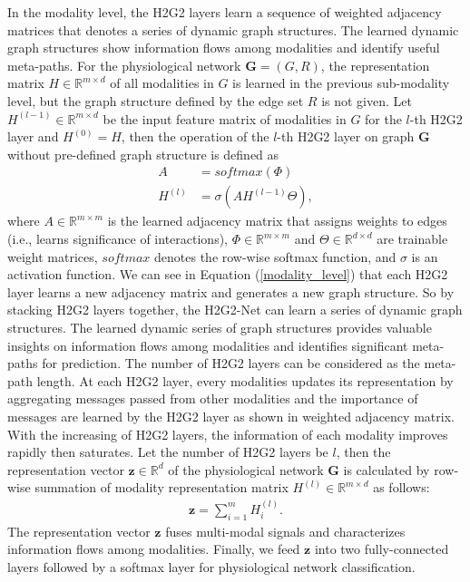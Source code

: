 \documentclass[letterpaper]{article} %
\begin{document}
In the modality level, the H2G2 layers learn a sequence of weighted adjacency matrices that denotes a series of dynamic graph structures. The learned dynamic graph structures show information flows among modalities and identify useful meta-paths. For the physiological network $\mathbf{G}=(G, R)$, the representation matrix $H\in\mathbb{R}^{m\times d}$ of all modalities in $G$ is learned in the previous sub-modality level, but the graph structure defined by the edge set $R$ is not given. Let $H^{(l-1)}\in\mathbb{R}^{m\times d}$ be the input feature matrix of modalities in $G$ for the $l$-th H2G2 layer and $H^{(0)}=H$, then the operation of the $l$-th H2G2 layer on graph $\mathbf{G}$ without pre-defined graph structure is defined as
\begin{align}
    \label{modality_level}
    A &= softmax(\Phi) \\
    H^{(l)} &= \sigma \left( A H^{(l-1)} \Theta \right),
\end{align}
where $A\in\mathbb{R}^{m\times m}$ is the learned adjacency matrix that assigns weights to edges (i.e., learns significance of interactions), $\Phi\in\mathbb{R}^{m\times m}$ and $\Theta\in\mathbb{R}^{d\times d}$ are trainable weight matrices, $softmax$ denotes the row-wise softmax function, and $\sigma$ is an activation function. We can see in Equation (\ref{modality_level}) that each H2G2 layer learns a new adjacency matrix and generates a new graph structure. So by stacking H2G2 layers together, the H2G2-Net can learn a series of dynamic graph structures. The learned dynamic series of graph structures provides valuable insights on information flows among modalities and identifies significant meta-paths for prediction. The number of H2G2 layers can be considered as the meta-path length. At each H2G2 layer, every modalities updates its representation by aggregating messages passed from other modalities and the importance of messages are learned by the H2G2 layer as shown in weighted adjacency matrix. With the increasing of H2G2 layers, the information of each modality improves rapidly then saturates. Let the number of H2G2 layers be $l$, then the representation vector $\mathbf{z}\in\mathbb{R}^{d}$ of the physiological network $\mathbf{G}$ is calculated by row-wise summation of modality representation matrix $H^{(l)}\in\mathbb{R}^{m\times d}$ as follows:
\begin{align}
    \mathbf{z} = \sum_{i=1}^{m} H_i^{(l)}.
\end{align}
The representation vector $\mathbf{z}$ fuses multi-modal signals and characterizes information flows among modalities. Finally, we feed $\mathbf{z}$ into two fully-connected layers followed by a softmax layer for physiological network classification.
\end{document}
